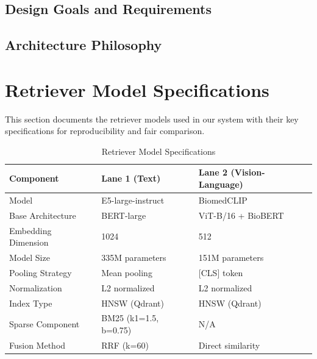\subsection{Design Goals and Requirements}
\label{subsec:methodology:overview:goals}

\subsection{Architecture Philosophy}
\label{subsec:methodology:overview:philosophy}

%
%
\section{Retriever Model Specifications}
\label{sec:methodology:retriever}


This section documents the retriever models used in our system with their key specifications for reproducibility and fair comparison.

\begin{table}[htbp]
  \centering
  \caption{Retriever Model Specifications}
  \label{tab:methodology:retriever-specs}
  \begin{tabularx}{\textwidth}{lXX}
    \toprule
    \textbf{Component} & \textbf{Lane 1 (Text)} & \textbf{Lane 2 (Vision-Language)} \\
    \midrule
    Model & E5-large-instruct & BiomedCLIP \\
    Base Architecture & BERT-large & ViT-B/16 + BioBERT \\
    Embedding Dimension & 1024 & 512 \\
    Model Size & 335M parameters & 151M parameters \\
    Pooling Strategy & Mean pooling & [CLS] token \\
    Normalization & L2 normalized & L2 normalized \\
    Index Type & HNSW (Qdrant) & HNSW (Qdrant) \\
    Sparse Component & BM25 (k1=1.5, b=0.75) & N/A \\
    Fusion Method & RRF (k=60) & Direct similarity \\
    \bottomrule
  \end{tabularx}
\end{table}

